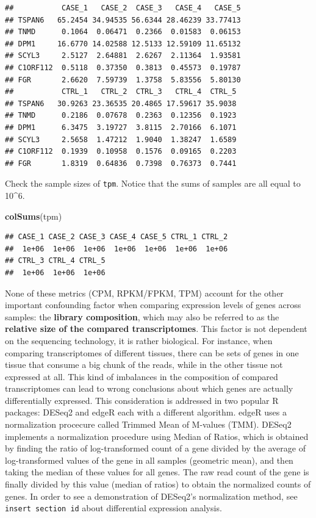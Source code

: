 \documentclass[12pt,]{krantz}
\newenvironment{Shaded}{\begin{snugshade}}{\end{snugshade}}
\newcommand{\KeywordTok}[1]{\textcolor[rgb]{0.13,0.29,0.53}{\textbf{#1}}}
\newcommand{\NormalTok}[1]{#1}
\begin{document}
\begin{verbatim}
##           CASE_1   CASE_2  CASE_3   CASE_4   CASE_5
## TSPAN6   65.2454 34.94535 56.6344 28.46239 33.77413
## TNMD      0.1064  0.06471  0.2366  0.01583  0.06153
## DPM1     16.6770 14.02588 12.5133 12.59109 11.65132
## SCYL3     2.5127  2.64881  2.6267  2.11364  1.93581
## C1ORF112  0.5118  0.37350  0.3813  0.45573  0.19787
## FGR       2.6620  7.59739  1.3758  5.83556  5.80130
##           CTRL_1   CTRL_2  CTRL_3   CTRL_4  CTRL_5
## TSPAN6   30.9263 23.36535 20.4865 17.59617 35.9038
## TNMD      0.2186  0.07678  0.2363  0.12356  0.1923
## DPM1      6.3475  3.19727  3.8115  2.70166  6.1071
## SCYL3     2.5658  1.47212  1.9040  1.38247  1.6589
## C1ORF112  0.1939  0.10958  0.1576  0.09165  0.2203
## FGR       1.8319  0.64836  0.7398  0.76373  0.7441
\end{verbatim}

Check the sample sizes of \texttt{tpm}. Notice that the sums of samples are all equal to 10\^{}6.

\begin{Shaded}
\begin{Highlighting}[]
\KeywordTok{colSums}\NormalTok{(tpm)}
\end{Highlighting}
\end{Shaded}

\begin{verbatim}
## CASE_1 CASE_2 CASE_3 CASE_4 CASE_5 CTRL_1 CTRL_2 
##  1e+06  1e+06  1e+06  1e+06  1e+06  1e+06  1e+06 
## CTRL_3 CTRL_4 CTRL_5 
##  1e+06  1e+06  1e+06
\end{verbatim}

None of these metrics (CPM, RPKM/FPKM, TPM) account for the other important confounding factor when comparing expression levels of genes across samples: the \textbf{library composition}, which may also be referred to as the \textbf{relative size of the compared transcriptomes}. This factor is not dependent on the sequencing technology, it is rather biological. For instance, when comparing transcriptomes of different tissues, there can be sets of genes in one tissue that consume a big chunk of the reads, while in the other tissue not expressed at all. This kind of imbalances in the composition of compared transcriptomes can lead to wrong conclusions about which genes are actually differentially expressed. This consideration is addressed in two popular R packages: DESeq2 \citep{love_moderated_2014} and edgeR \citep{robinson_edger:_2010} each with a different algorithm. edgeR uses a normalization procecure called Trimmed Mean of M-values (TMM). DESeq2 implements a normalization procedure using Median of Ratios, which is obtained by finding the ratio of log-transformed count of a gene divided by the average of log-transformed values of the gene in all samples (geometric mean), and then taking the median of these values for all genes. The raw read count of the gene is finally divided by this value (median of ratios) to obtain the normalized counts of genes. In order to see a demonstration of DESeq2's normalization method, see \texttt{insert\ section\ id} about differential expression analysis.
\end{document}
